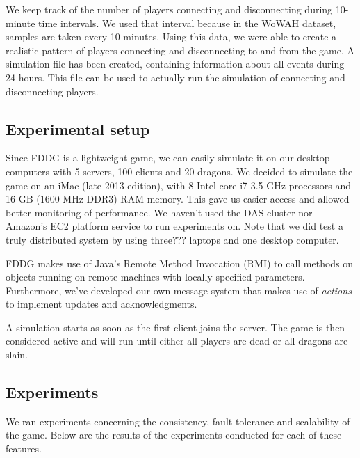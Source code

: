 We keep track of the number of players connecting and disconnecting during 10-minute time intervals.
We used that interval because in the WoWAH dataset, samples are taken every 10 minutes.
Using this data, we were able to create a realistic pattern of players connecting and disconnecting to and from the game.
A simulation file has been created, containing information about all events during 24 hours. This file can be used to actually run the simulation of connecting and disconnecting players.

\subsection{Experimental setup}
\label{subsec:experimental_setup}

	Since FDDG is a lightweight game, we can easily simulate it on our desktop computers with 5 servers, 100 clients and 20 dragons. 
	We decided to simulate the game on an iMac (late 2013 edition), with 8 Intel core i7 3.5 GHz processors and 16 GB (1600 MHz DDR3) RAM memory. 
	This gave us easier access and allowed better monitoring of performance.
	We haven't used the DAS cluster nor Amazon's EC2 platform service to run experiments on. 
	Note that we did test a truly distributed system by using three??? laptops and one desktop computer.
	
	FDDG makes use of Java's Remote Method Invocation (RMI) to call methods on objects running on remote machines with locally specified parameters. 
	Furthermore, we've developed our own message system that makes use of \emph{actions} to implement updates and acknowledgments.
	
	A simulation starts as soon as the first client joins the server. The game is then considered active and will run until either all players are dead or all dragons are slain.


\subsection{Experiments}
\label{subsec:experiments}
	We ran experiments concerning the consistency, fault-tolerance and scalability of the game. Below are the results of the experiments conducted for each of these features.


